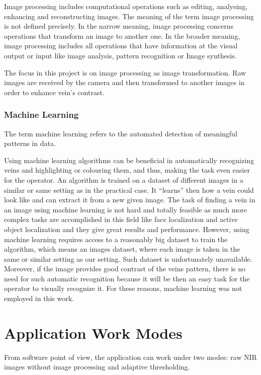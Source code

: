 Image processing includes computational operations such as editing, analysing, enhancing and reconstructing images. 
The meaning of the term image processing is not defined precisely. In the narrow meaning, image processing concerns operations that transform an image to another one. In the broader meaning, image processing includes all operations that have information at the visual output or input like image analysis, pattern recognition or Image synthesis. 

The focus in this project is on image processing as image transformation. Raw images are received by the camera and then transformed to another images in order to enhance vein’s contrast.


\subsubsection{Machine Learning}

The term machine learning refers to the automated detection of meaningful patterns in data\parencite{machineLearning}.

Using machine learning algorithms can be beneficial in automatically recognizing veins and highlighting or colouring them, and thus, making the task even easier for the operator. An algorithm is trained on a dataset of different images in a similar or same setting as in the practical case. It “learns” then how a vein could look like and can extract it from a new given image. The task of finding a vein in an image using machine learning is not hard and totally feasible as much more complex tasks are accomplished in this field like face localization\parencite{faceLocal} and active object localization \parencite{objectLocal} and they give great results and performance. However, using machine learning requires access to a reasonably big dataset to train the algorithm, which means an images dataset, where each image is taken in the same or similar setting as our setting. Such dataset is unfortunately unavailable.
Moreover, if the image provides good contrast of the veins pattern, there is no need for such automatic recognition because it will be then an easy task for the operator to visually recognize it. For these reasons, machine learning was not employed in this work.


\section{Application Work Modes}
From software point of view, the application can work under two modes: raw NIR images without image processing and adaptive thresholding.

